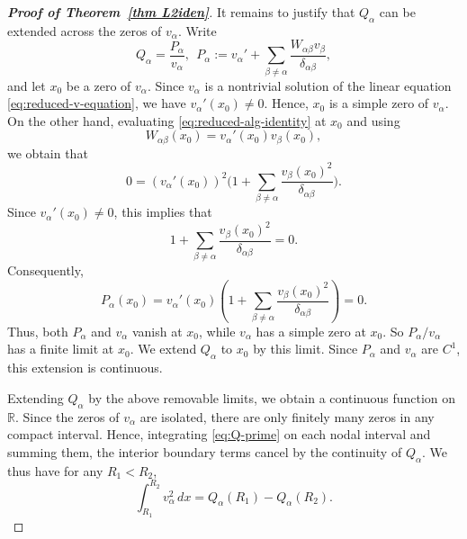 \documentclass[11pt]{article}
\numberwithin{equation}{section}
\theoremstyle{definition}
\begin{document}
\begin{proof}[\normalfont \bfseries Proof of Theorem~\ref{thm L2iden}]
It remains to justify that \(Q_\alpha\) can be extended across the zeros of
\(v_\alpha\). Write
\[
Q_\alpha=\frac{P_\alpha}{v_\alpha},
\ \
P_\alpha:=
v_\alpha'
+
\sum_{\beta\neq\alpha}
\frac{W_{\alpha\beta}v_\beta}{\delta_{\alpha\beta}} ,
\]
and let \(x_0\) be a zero of \(v_\alpha\). Since \(v_\alpha\) is a nontrivial
solution of the linear equation \eqref{eq:reduced-v-equation}, we have
\(v_\alpha'(x_0)\neq0\). Hence, \(x_0\) is a simple zero of \(v_\alpha\).
On the other hand, evaluating \eqref{eq:reduced-alg-identity} at \(x_0\)
and using
\[
W_{\alpha\beta}(x_0)=v_\alpha'(x_0)v_\beta(x_0),
\]
we obtain that
\[
0
=
(v_\alpha'(x_0))^2
\Big(
1+
\sum_{\beta\neq\alpha}
\frac{v_\beta(x_0)^2}{\delta_{\alpha\beta}}
\Big).
\]
Since \(v_\alpha'(x_0)\neq0\), this implies that
\[
1+
\sum_{\beta\neq\alpha}
\frac{v_\beta(x_0)^2}{\delta_{\alpha\beta}}
=0 .
\]
Consequently,
\[
P_\alpha(x_0)
=
v_\alpha'(x_0)
\left(
1+
\sum_{\beta\neq\alpha}
\frac{v_\beta(x_0)^2}{\delta_{\alpha\beta}}
\right)
=0 .
\]
Thus, both \(P_\alpha\) and \(v_\alpha\) vanish at \(x_0\), while
\(v_\alpha\) has a simple zero at \(x_0\). So \(P_\alpha/v_\alpha\) has a
finite limit at \(x_0\). We extend \(Q_\alpha\) to \(x_0\) by this limit.
Since \(P_\alpha\) and \(v_\alpha\) are \(C^1\), this extension is continuous.


Extending \(Q_\alpha\) by the above removable limits, we obtain a continuous
function on \(\mathbb R\). Since the zeros of \(v_\alpha\) are isolated,
there are only finitely many zeros in any compact interval. Hence, integrating
\eqref{eq:Q-prime} on each nodal interval and summing them, the interior boundary
terms cancel by the continuity of \(Q_\alpha\). We thus have for any
\(R_1<R_2\),
\begin{equation}\label{eq:int-v-Q}
\int_{R_1}^{R_2}v_\alpha^2\,dx
=
Q_\alpha(R_1)-Q_\alpha(R_2).
\end{equation}




\end{proof}
\end{document}
